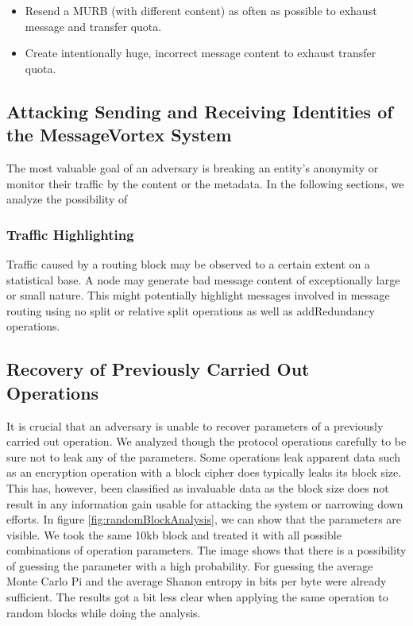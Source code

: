 \begin{itemize}
	\item Resend a MURB (with different content) as often as possible to exhaust message and transfer quota. 
	\item Create intentionally huge, incorrect message content to exhaust transfer quota.
\end{itemize}

\subsection{Attacking Sending and Receiving Identities of the MessageVortex System}
The most valuable goal of an adversary is breaking an entity's anonymity or monitor their traffic by the content or the metadata. In the following sections, we analyze the possibility of 


\subsubsection{Traffic Highlighting}
Traffic caused by a routing block may be observed to a certain extent on a statistical base. A node may generate bad message content of exceptionally large or small nature. This might potentially highlight messages involved in message routing using no split or relative split operations as well as addRedundancy operations.

\subsection{Recovery of Previously Carried Out Operations}
It is crucial that an adversary is unable to recover parameters of a previously carried out operation. We analyzed though the protocol operations carefully to be sure not to leak any of the parameters. Some operations leak apparent data such as an encryption operation with a block cipher does typically leaks its block size. This has, however, been classified as invaluable data as the block size does not result in any information gain usable for attacking the system or narrowing down efforts. In figure \ref{fig:randomBlockAnalysis}, we can show that the parameters are visible. We took the same 10kb block and treated it with all possible combinations of operation parameters. The image shows that there is a possibility of guessing the parameter with a high probability. For guessing the average Monte Carlo Pi and the average Shanon entropy in bits per byte were already sufficient. The results got a bit less clear when applying the same operation to random blocks while doing the analysis. 

